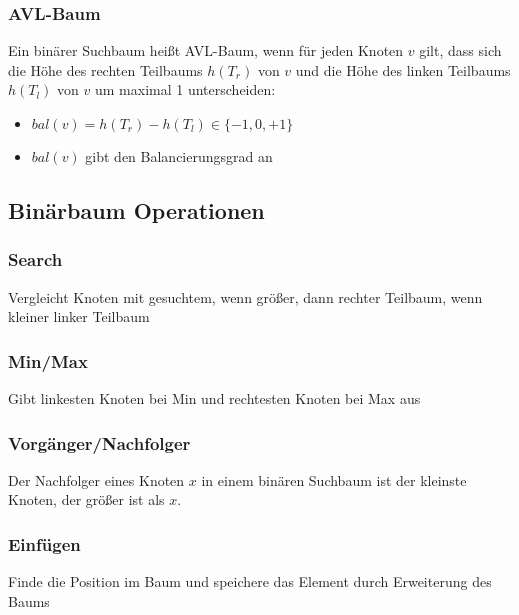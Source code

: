 \subsubsection{AVL-Baum}
	Ein binärer Suchbaum heißt AVL-Baum, wenn für jeden Knoten $v$ gilt, dass sich die Höhe des rechten Teilbaums $h(T_r)$ von $v$ und die Höhe des linken Teilbaums $h(T_l)$ von $v$ um maximal 1 unterscheiden:
	\begin{itemize}
	  \item $bal(v)=h(T_r)-h(T_l)\in\{-1,0,+1\}$
	  \item $bal(v)$ gibt den Balancierungsgrad an
	\end{itemize}

\subsection{Binärbaum Operationen}
\subsubsection{Search}
	Vergleicht Knoten mit gesuchtem, wenn größer, dann rechter Teilbaum, wenn kleiner linker Teilbaum
\subsubsection{Min/Max}
	Gibt linkesten Knoten bei Min und rechtesten Knoten bei Max aus
\subsubsection{Vorgänger/Nachfolger}
	Der Nachfolger eines Knoten $x$ in einem binären Suchbaum ist der kleinste Knoten, der größer ist als $x$. 
\subsubsection{Einfügen}
	Finde die Position im Baum und speichere das Element durch Erweiterung des Baums 
